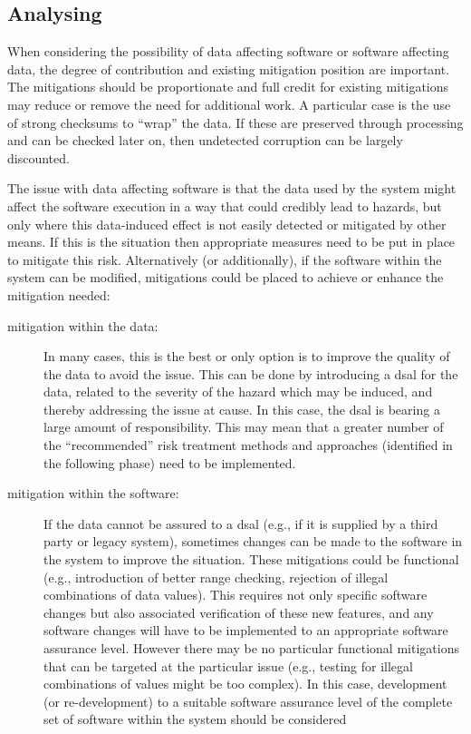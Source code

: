 \subsection{Analysing }
When considering the possibility of data affecting software or software affecting data, the degree of contribution and existing \gls{mitigation} position are important. The \glspl{mitigation} should be proportionate and full credit for existing \glspl{mitigation} may reduce or remove the need for additional work. A particular case is the use of strong checksums to ``wrap'' the data. If these are preserved through processing and can be checked later on, then undetected  corruption can be largely discounted.

The issue with data affecting software is that the data used by the system might affect the software execution in a way that could credibly lead to \glspl{hazard}, but only where this data-induced effect is not easily detected or mitigated by other means. If this is the situation then appropriate measures need to be put in place  to mitigate this risk. Alternatively (or additionally), if the software within the system can be modified, \glspl{mitigation} could be placed  to achieve or enhance the \gls{mitigation} needed:

\begin{description}
  \item[\Gls{mitigation} within the data:] In many cases, this is the best or only option is to improve the quality of the data to avoid the issue. This can be done by introducing a \gls{dsal} for the data, related to the severity of the \gls{hazard} which may be induced, and thereby addressing the issue at cause. In this case, the \gls{dsal} is bearing a large amount of responsibility. This may mean that a greater number of the ``recommended'' risk \gls{treatment} methods and approaches (identified in the following phase) need to be implemented.
  \item[\Gls{mitigation} within the software:] If the data cannot be assured to a \gls{dsal} (e.g., if it is supplied by a third party or legacy system), sometimes changes can be made to the software in the system to improve the situation. These \glspl{mitigation} could be functional (e.g., introduction of better range checking, rejection of illegal combinations of data values). This requires not only specific software changes but also associated \gls{verification} of these new features, and any software changes will have to be implemented to an appropriate \gls{software assurance level}. However there may be no particular functional \glspl{mitigation} that can be targeted at the particular issue (e.g., testing for illegal combinations of values might be too complex). In this case, development (or re-development) to a suitable \gls{software assurance level} of the complete set of software within the system should be considered
\end{description}

